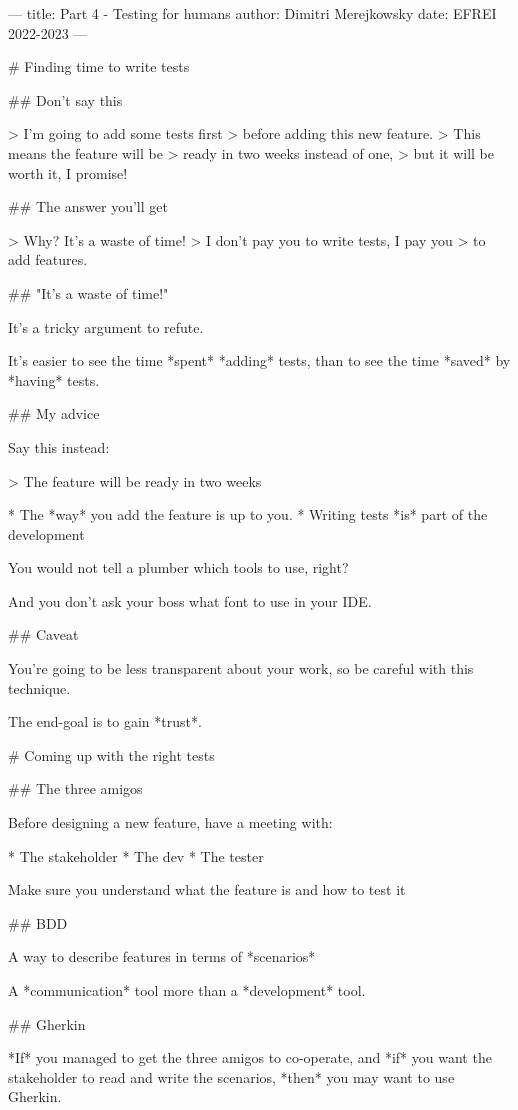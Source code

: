 ---
title: Part 4 - Testing for humans
author: Dimitri Merejkowsky
date: EFREI 2022-2023
---

# Finding time to write tests

## Don't say this


> I'm going to add some tests first
> before adding this new feature.
> This means the feature will be
> ready in two weeks instead of one,
> but it will be worth it, I promise!


## The answer you'll get

> Why? It's a waste of time!
> I don't pay you to write tests, I pay you
> to add features.

## "It's a waste of time!"

It's a tricky argument to refute.

It's easier to see the time *spent*
*adding* tests, than to see the time *saved*
by *having* tests.

## My advice

Say this instead:


> The feature will be ready in two weeks

* The *way* you add the feature is up to you.
* Writing tests *is* part of the development

You would not tell a plumber which tools to use, right?

And you don't ask your boss what font to use in your IDE.

## Caveat

You're going to be less transparent about your work,
so be careful with this technique.

\vfill

The end-goal is to gain *trust*.

# Coming up with the right tests

## The three amigos

Before designing a new feature, have a meeting with:

* The stakeholder
* The dev
* The tester

Make sure you understand what the feature is
and how to test it

## BDD

A way to describe features in terms of *scenarios*

A *communication* tool more than a *development* tool.

## Gherkin

*If* you managed to get the three amigos to co-operate, and *if* you
want the stakeholder to read and write the scenarios, *then* you may
want to use
Gherkin.

